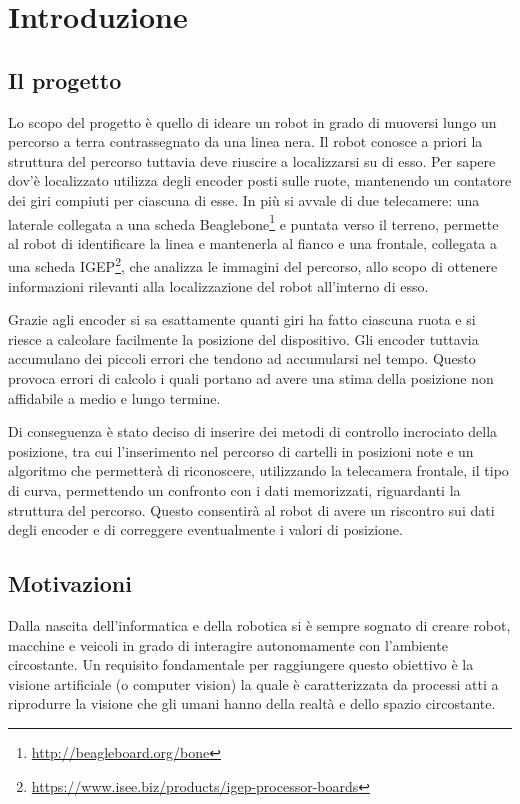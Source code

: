 \chapter{Introduzione}

\section{Il progetto}
	Lo scopo del progetto è quello di ideare un robot in grado di muoversi lungo un percorso a terra contrassegnato da una linea nera. Il robot conosce a priori la struttura del percorso tuttavia deve riuscire a localizzarsi su di esso. Per sapere dov'è localizzato utilizza degli encoder posti sulle ruote, mantenendo un contatore dei giri compiuti per ciascuna di esse. In più si avvale di due telecamere: una laterale collegata a una scheda Beaglebone\footnote{\url{http://beagleboard.org/bone}} e puntata verso il terreno, permette al robot di identificare la linea e mantenerla al fianco e una frontale, collegata a una scheda IGEP\footnote{\url{https://www.isee.biz/products/igep-processor-boards}}, che analizza le immagini del percorso, allo scopo di ottenere informazioni rilevanti alla localizzazione del robot all'interno di esso.

	Grazie agli encoder si sa esattamente quanti giri ha fatto ciascuna ruota e si riesce a calcolare facilmente la posizione del dispositivo. Gli encoder tuttavia accumulano dei piccoli errori che tendono ad accumularsi nel tempo. Questo provoca errori di calcolo i quali portano ad avere una stima della posizione non affidabile a medio e lungo termine.

	Di conseguenza è stato deciso di inserire dei metodi di controllo incrociato della posizione, tra cui l'inserimento nel percorso di cartelli in posizioni note\cite{bombo} e un algoritmo che permetterà di riconoscere, utilizzando la telecamera frontale, il tipo di curva, permettendo un confronto con i dati memorizzati, riguardanti la struttura del percorso. Questo consentirà al robot di avere un riscontro sui dati degli encoder e di correggere eventualmente i valori di posizione.

\section{Motivazioni}
	Dalla nascita dell'informatica e della robotica si è sempre sognato di creare robot, macchine e veicoli in grado di interagire autonomamente con l'ambiente circostante. Un requisito fondamentale per raggiungere questo obiettivo è la visione artificiale (o computer vision) la quale è caratterizzata da processi atti a riprodurre la visione che gli umani hanno della realtà e dello spazio circostante.

